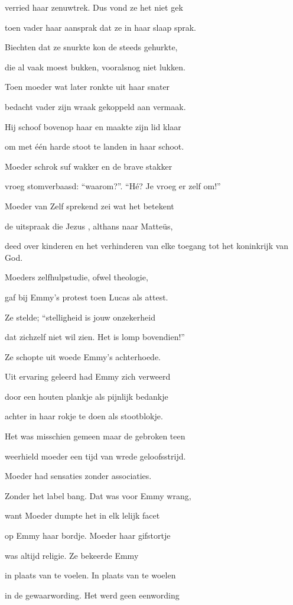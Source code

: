 verried haar zenuwtrek.
Dus vond ze het niet gek

toen vader haar aansprak
dat ze in haar slaap sprak.

Biechten dat ze snurkte
kon de steeds gehurkte,

die al vaak moest bukken,
vooralsnog niet lukken.

Toen moeder wat later
ronkte uit haar snater

bedacht vader zijn wraak
gekoppeld aan vermaak.

Hij schoof bovenop haar
en maakte zijn lid klaar

om met één harde stoot
te landen in haar schoot.

Moeder schrok suf wakker
en de brave stakker

vroeg stomverbaasd: “waarom?”.
“Hé? Je vroeg er zelf om!”

Moeder van Zelf sprekend
zei wat het betekent

de uitspraak die Jezus ,
althans naar Matteüs,

deed over kinderen
en het verhinderen
van elke toegang tot
het koninkrijk van God.

Moeders zelfhulpstudie,
ofwel theologie,

gaf bij Emmy’s protest
toen Lucas als attest.

Ze stelde; “stelligheid
is jouw onzekerheid

dat zichzelf niet wil zien.
Het is lomp bovendien!”

Ze schopte uit woede
Emmy’s achterhoede.

Uit ervaring geleerd
had Emmy zich verweerd

door een houten plankje
als pijnlijk bedankje

achter in haar rokje
te doen als stootblokje.

Het was misschien gemeen
maar de gebroken teen

weerhield moeder een tijd
van wrede geloofsstrijd.

Moeder had sensaties
zonder associaties.

Zonder het label bang.
Dat was voor Emmy wrang,

want Moeder dumpte het
in elk lelijk facet

op Emmy haar bordje.
Moeder haar gifstortje

was altijd religie.
Ze bekeerde Emmy

in plaats van te voelen.
In plaats van te woelen

in de gewaarwording.
Het werd geen eenwording

